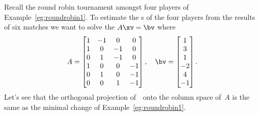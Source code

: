 \begin{example} \label{eg:roundrobin2}
Recall the round robin tournament amongst four players of Example~\ref{eg:roundrobin1}.
To estimate the s of the four players from the results of six matches we want to solve the 
 \(A\xv=\bv\) where
\begin{equation*}
A=\begin{bmatrix}    1 & -1 & 0 & 0
\\ 1 & 0 & -1 & 0
\\ 0 & 1 & -1 & 0
\\ 1 & 0 & 0 & -1
\\ 0 & 1 & 0 & -1
\\ 0 & 0 & 1 & -1
 \end{bmatrix},\quad
 \bv=\begin{bmatrix} 1\\ 3\\ 1\\ -2\\ 4\\ -1 \end{bmatrix}.
\end{equation*}
Let's see that the orthogonal projection of~\bv\ onto the column space of~\(A\) is the same as the minimal change of Example~\ref{eg:roundrobin1}.


\end{example}
